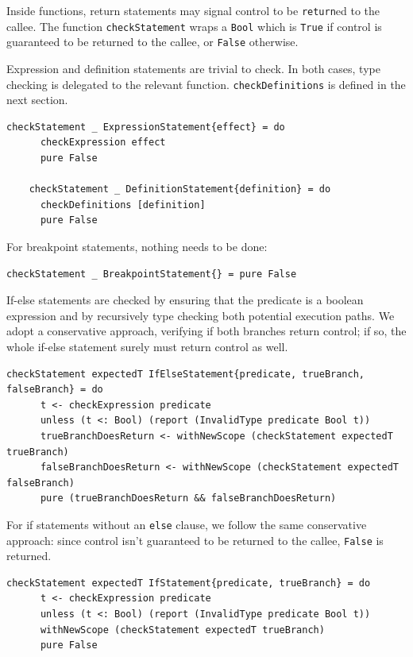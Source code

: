 \documentclass[UdineBachThesis,american,11pt]{PhdThesis}
\begin{document}
  Inside functions, return statements may signal control to be
  \mbox{\texttt{return}ed} to the callee. The function
  \mbox{\texttt{checkStatement}} wraps a \mbox{\texttt{Bool}} which is
  \mbox{\texttt{True}} if control is guaranteed to be returned to the callee, or
  \mbox{\texttt{False}} otherwise.

  Expression and definition statements are trivial to check. In both cases, type
  checking is delegated to the relevant function.
  \mbox{\texttt{checkDefinitions}} is defined in the next section.

  \begin{Verbatim}[gobble=4,fontsize=\small]
    checkStatement _ ExpressionStatement{effect} = do
      checkExpression effect
      pure False

    checkStatement _ DefinitionStatement{definition} = do
      checkDefinitions [definition]
      pure False
  \end{Verbatim}

  \pagebreak

  For breakpoint statements, nothing needs to be done:

  \begin{Verbatim}[gobble=4,fontsize=\small]
    checkStatement _ BreakpointStatement{} = pure False
  \end{Verbatim}

  If-else statements are checked by ensuring that the predicate is a boolean
  expression and by recursively type checking both potential execution paths. We
  adopt a conservative approach, verifying if both branches return control; if
  so, the whole if-else statement surely must return control as well.

  \begin{Verbatim}[gobble=4,fontsize=\small]
    checkStatement expectedT IfElseStatement{predicate, trueBranch, falseBranch} = do
      t <- checkExpression predicate
      unless (t <: Bool) (report (InvalidType predicate Bool t))
      trueBranchDoesReturn <- withNewScope (checkStatement expectedT trueBranch)
      falseBranchDoesReturn <- withNewScope (checkStatement expectedT falseBranch)
      pure (trueBranchDoesReturn && falseBranchDoesReturn)
  \end{Verbatim}

  For if statements without an \mbox{\texttt{else}} clause, we follow the same
  conservative approach: since control isn't guaranteed to be returned to the
  callee, \mbox{\texttt{False}} is returned.

  \begin{Verbatim}[gobble=4,fontsize=\small]
    checkStatement expectedT IfStatement{predicate, trueBranch} = do
      t <- checkExpression predicate
      unless (t <: Bool) (report (InvalidType predicate Bool t))
      withNewScope (checkStatement expectedT trueBranch)
      pure False
  \end{Verbatim}
\end{document}
